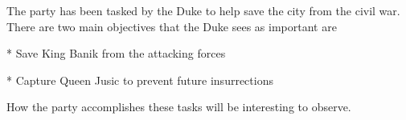 The party has been tasked by the Duke to help save the city from the civil war.
There are two main objectives that the Duke sees as important are

* Save King Banik from the attacking forces

* Capture Queen Jusic to prevent future insurrections

How the party accomplishes these tasks will be interesting to observe.
